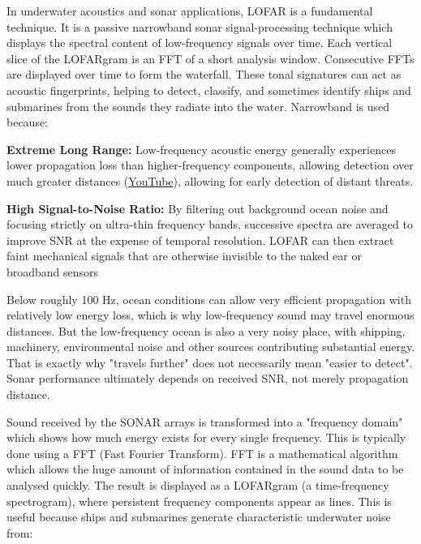 In underwater acoustics and sonar applications, LOFAR is a fundamental technique. It is a passive narrowband sonar signal-processing technique which displays the spectral content of low-frequency signals over time. Each vertical slice of the LOFARgram is an FFT of a short analysis window. Consecutive FFTs are displayed over time to form the waterfall. These tonal signatures can act as acoustic fingerprints, helping to detect, classify, and sometimes identify ships and submarines from the sounds they radiate into the water. Narrowband is used because:

\begin{compactitem}
    \item \textbf{Extreme Long Range: }Low-frequency acoustic energy generally experiences lower propagation loss than higher-frequency components, allowing detection over much greater distances (\href{https://www.youtube.com/watch?v=sP85wUcg6_A}{YouTube}), allowing for early detection of distant threats.
    \item \textbf{High Signal-to-Noise Ratio: }By filtering out background ocean noise and focusing strictly on ultra-thin frequency bands, successive spectra are averaged to improve SNR at the expense of temporal resolution. LOFAR can then extract faint mechanical signals that are otherwise invisible to the naked ear or broadband sensors
\end{compactitem}

\begin{learnpoint}
    Below roughly 100 Hz, ocean conditions can allow very efficient propagation with relatively low energy loss, which is why low-frequency sound may travel enormous distances. But the low-frequency ocean is also a very noisy place, with shipping, machinery, environmental noise and other sources contributing substantial energy. That is exactly why "travels further" does not necessarily mean "easier to detect". Sonar performance ultimately depends on received SNR, not merely propagation distance.
\end{learnpoint}

Sound received by the SONAR arrays is transformed into a "frequency domain" which shows how much energy exists for every single frequency. This is typically done using a FFT (Fast Fourier Transform). FFT is a mathematical algorithm which allows the huge amount of information contained in the sound data to be analysed quickly. The result is displayed as a LOFARgram (a time-frequency spectrogram), where persistent frequency components appear as lines. This is useful because ships and submarines generate characteristic underwater noise from:

